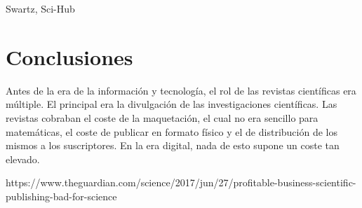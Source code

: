 Swartz, Sci-Hub

\section{Conclusiones}

Antes de la era de la información y tecnología, el rol de las revistas científicas era múltiple. El principal era la divulgación de las investigaciones científicas. Las revistas cobraban el coste de la maquetación, el cual no era sencillo para matemáticas, el coste de publicar en formato físico y el de distribución de los mismos a los suscriptores. En la era digital, nada de esto supone un coste tan elevado.

https://www.theguardian.com/science/2017/jun/27/profitable-business-scientific-publishing-bad-for-science
